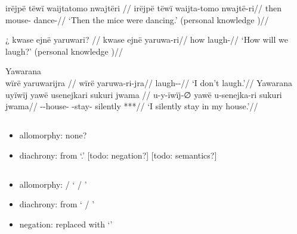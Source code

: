 \documentclass{memoir}
\begin{document}
\ex \label{ctorat-16}
\begingl \glpreamble irëjpë tëwï waijtatomo nwajtëri //
\gla irëjpë tëwï waijta-tomo nwajtë-ri//
\glb then  mouse- dance-//
\glft ‘Then the mice were dancing.’ (personal knowledge
)//
\endgl
\xe

\ex \label{convrisamaj-6}
\begingl \glpreamble ¿ kwase ejnë yaruwari? //
\gla kwase ejnë yaruwa-ri//
\glb how  laugh-//
\glft ‘How will we laugh?’ (personal knowledge
)//
\endgl
\xe

\pex\label{gnomicri}    \a Yawarana\\
    \label{convrisamaj-4}        \begingl
        \glpreamble wïrë yaruwarijra //
        \gla wïrë yaruwa-ri-jra//
        \glb {} laugh--//
            \glft ‘I don’t laugh.’//  
        \endgl 
    \a Yawarana\\
    \label{convrisamaj-28}        \begingl
        \glpreamble uyïwïj yawë usenejkari sukuri jwama //
        \gla u-y-ïwïj-∅ yawë u-senejka-ri sukuri jwama//
        \glb {}--house-  -stay- silently ***//
            \glft ‘I silently stay in my house.’//  
        \endgl 
\xe

\subsection{\texorpdfstring{}{}}

\begin{itemize}
\tightlist
\item
  allomorphy: none?
\item
  diachrony: from  `.' {[}todo:
  negation?{]} {[}todo: semantics?{]}
\end{itemize}

\subsection{\texorpdfstring{}{}}

\begin{itemize}
\tightlist
\item
  allomorphy: / ` / '
\item
  diachrony: from  ` / '
\item
  negation: replaced with  `' 
\end{itemize}
\end{document}
